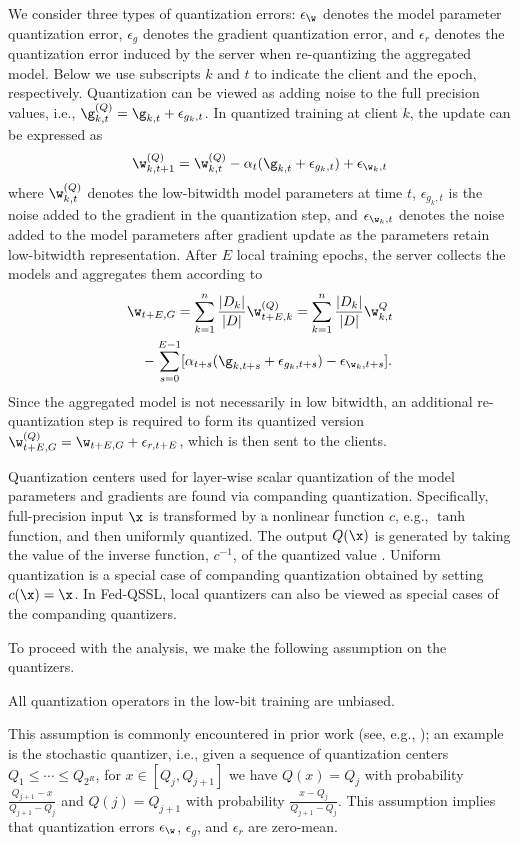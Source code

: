 We consider three types of quantization errors: $\epsilon_{\w}$ denotes the model parameter quantization error, $\epsilon_g$ denotes the gradient quantization error, and $\epsilon_r$ denotes the quantization error induced by the server when re-quantizing the aggregated model. Below we use subscripts $k$ and $t$ to indicate the client and the epoch, respectively. Quantization can be viewed as adding noise to the full precision values, i.e., $\g^{(Q)}_{k, t} = \g_{k, t} + \epsilon_{g_k, t} $. In quantized training at client $k$, the update can be expressed as
\begin{align*}
    \w_{k, t+1}^{(Q)} = \w_{k, t}^{(Q)} - \alpha_t (\g_{k, t} + \epsilon_{g_k, t} )+ \epsilon_{\w_k, t}
\end{align*}
where $\w_{k, t}^{(Q)}$ denotes the low-bitwidth model parameters at time $t$, $\epsilon_{g_k, t}$ is the noise added to the gradient in the quantization step, and $\epsilon_{\w_k, t}$ denotes the noise added to the model parameters after gradient update as the parameters retain low-bitwidth representation. After $E$ local training epochs, the server collects the models and aggregates them according to 
\begin{align*}
    & \w_{t+E, G} = \sum_{k=1}^n \frac{|D_k|}{|D|} \w_{t+E, k}^{(Q)} = \sum_{k=1}^n \frac{|D_k|}{|D|} \w_{k, t}^{{Q}} \\
    & \quad - \sum_{s=0}^{E-1} [\alpha_{t+s}(\g_{k, t+s} + \epsilon_{g_k, t+s} ) - \epsilon_{\w_k, t+s}].
\end{align*}
Since the aggregated model is not necessarily in low bitwidth, an additional re-quantization step is required to form its quantized version $\w_{t+E, G}^{(Q)} = \w_{t+E, G} + \epsilon_{r, t+E}$, which is then sent to the clients.

Quantization centers used for layer-wise scalar quantization of the model parameters and gradients are found via companding quantization. Specifically, full-precision input $\x$ is transformed by a nonlinear function $c$, e.g., $\tanh$ function, and then uniformly quantized. The output $Q(\x)$ is generated by taking the value of the inverse function, $c^{-1}$, of the quantized value \cite{sun2011scalar}. Uniform quantization is  a special case of companding quantization obtained by setting $c(\x) = \x$. In Fed-QSSL, local quantizers can also be viewed as special cases of the companding quantizers.

To proceed with the analysis, we make the following assumption on the quantizers.
\begin{assumption}\label{Assumption-1}
    All quantization operators in the low-bit training are unbiased.
\end{assumption}
This assumption is commonly encountered in prior work (see, e.g., \cite{reisizadeh2020fedpaq}); an example is the stochastic quantizer, i.e., given a sequence of quantization centers $Q_1 \leq \cdots \leq Q_{2^R}$, for $x \in [Q_j, Q_{j+1}]$ we have $Q(x) = Q_j$ with probability $\frac{Q_{j+1} - x}{Q_{j+1} - Q_j}$ and $Q(j) = Q_{j+1}$ with probability $\frac{x - Q_{j}}{Q_{j+1} - Q_j}$. This assumption implies that quantization errors $\epsilon_{\w}$, $\epsilon_{g}$, and $\epsilon_r$ are zero-mean.

